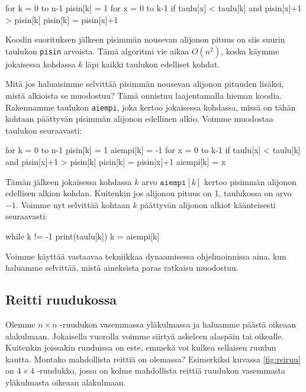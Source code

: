 \begin{code}
for k = 0 to n-1
    pisin[k] = 1
    for x = 0 to k-1
        if taulu[x] < taulu[k] and pisin[x]+1 > pisin[k]
            pisin[k] = pisin[x]+1
\end{code}

Koodin suorituksen jälkeen pisimmän nousevan alijonon pituus on
siis suurin taulukon \texttt{pisin} arvoista.
Tämä algoritmi vie aikaa $O(n^2)$, koska käym\-me jokaisessa
kohdassa $k$ läpi kaikki taulukon edelliset kohdat.

Mitä jos haluaisimme selvittää pisimmän nousevan alijonon
pituuden lisäksi, mistä alkioista se muodostuu?
Tämä onnistuu laajentamalla hieman koodia.
Rakennamme taulukon \texttt{aiempi},
joka kertoo jokaisessa kohdassa, missä on tähän kohtaan
päättyvän pisimmän alijonon edellinen alkio.
Voimme muodostaa taulukon seuraavasti:

\begin{code}
for k = 0 to n-1
    pisin[k] = 1
    aiempi[k] = -1
    for x = 0 to k-1
        if taulu[x] < taulu[k] and pisin[x]+1 > pisin[k]
            pisin[k] = pisin[x]+1
            aiempi[k] = x
\end{code}

Tämän jälkeen jokaisessa kohdassa $k$ arvo $\texttt{aiempi}[k]$
kertoo pisimmän alijonon edellisen alkion kohdan.
Kuitenkin jos alijonon pituus on 1, taulukossa on arvo $-1$.
Voimme nyt selvittää kohtaan $k$ päättyvän alijonon alkiot
käänteisesti seuraavasti:

\begin{code}
while k != -1
    print(taulu[k])
    k = aiempi[k]
\end{code}

Voimme käyttää vastaavaa tekniikkaa
dynaamisessa ohjelmoinnissa aina, kun haluamme
selvittää, mistä aineksista paras ratkaisu muodostuu.

\subsection{Reitti ruudukossa}

Olemme $n \times n$ -ruudukon vasemmassa yläkulmassa ja haluamme
päästä oikeaan alakulmaan.
Jokaisella vuorolla voimme siirtyä askeleen alaspäin tai oikealle.
Kuitenkin joissakin ruuduissa on este, emmekä voi kulkea sellaisen
ruudun kautta.
Montako mahdollista reittiä on olemassa?
Esimerkiksi kuvassa \ref{fig:reiruu} on $4 \times 4$ -ruudukko,
jossa on kolme mahdollista reittiä ruudukon
vasemmasta yläkulmasta oikeaan alakulmaan.


